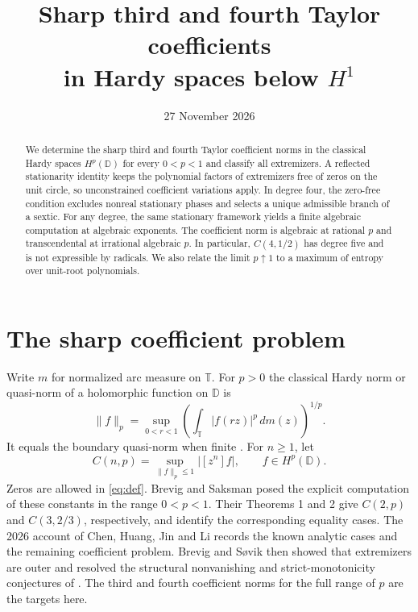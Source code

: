 \documentclass[11pt]{article}
\title{Sharp third and fourth Taylor coefficients\\in Hardy spaces below \texorpdfstring{$H^1$}{H1}}
\author{}
\date{27 November 2026}
\newcommand{\D}{\mathbb D}
\newcommand{\T}{\mathbb T}
\newcommand{\coef}[1]{[z^{#1}]}
\begin{document}
\maketitle

\begin{abstract}
We determine the sharp third and fourth Taylor coefficient norms in
the classical Hardy spaces \(H^p(\mathbb D)\) for every \(0<p<1\) and
classify all extremizers. A reflected stationarity identity keeps the
polynomial factors of extremizers free of zeros on the unit circle,
so unconstrained coefficient variations apply. In degree four, the
zero-free condition excludes nonreal stationary phases and selects a
unique admissible branch of a sextic. For any degree, the same
stationary framework yields a finite algebraic computation at
algebraic exponents. The coefficient norm is algebraic at rational
\(p\) and transcendental at irrational algebraic \(p\). In particular,
\(C(4,1/2)\) has degree five and is not expressible by radicals.
We also relate
the limit \(p\uparrow1\) to a maximum of entropy over unit-root
polynomials.
\end{abstract}

\section{The sharp coefficient problem}

Write \(m\) for normalized arc measure on \(\T\). For \(p>0\)
the classical Hardy norm or quasi-norm of a holomorphic function on \(\D\)
is
\[
 \|f\|_p=\sup_{0<r<1}
       \left(\int_{\T}|f(rz)|^p\,dm(z)\right)^{1/p}.
\]
It equals the boundary quasi-norm when finite \cite{Duren}. For \(n\ge1\), let
\begin{equation}\label{eq:def}
 C(n,p)=\sup_{\|f\|_p\le1}|\coef n f|,\qquad f\in H^p(\D).
\end{equation}
Zeros are allowed in \eqref{eq:def}. Brevig and Saksman
\cite{BrevigSaksman} posed the explicit computation of these constants
in the range \(0<p<1\). Their Theorems 1 and 2 give \(C(2,p)\) and
\(C(3,2/3)\), respectively, and identify the corresponding equality
cases. The 2026 account of Chen, Huang, Jin and Li \cite{ChenEtAl}
records the known analytic cases and the remaining coefficient
problem. Brevig and S{\o}vik \cite{BrevigSovik} then showed that
extremizers are outer and resolved the structural nonvanishing and
strict-monotonicity conjectures of \cite{BrevigSaksman}. The third
and fourth coefficient norms for the full range of \(p\) are the
targets here.
\end{document}
